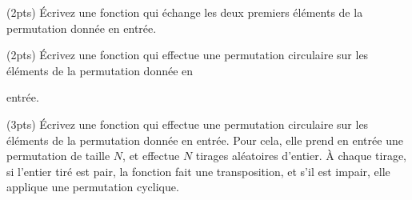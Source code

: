 \question (2pts) {\'E}crivez une fonction  qui {\'e}change les
deux premiers {\'e}l{\'e}ments de la permutation donn{\'e}e en entr{\'e}e.

\question (2pts) {\'E}crivez une fonction  qui effectue une
permutation circulaire sur les {\'e}l{\'e}ments de la permutation donn{\'e}e en

entr{\'e}e.

\question (3pts) {\'E}crivez une fonction  qui effectue
une permutation circulaire sur les {\'e}l{\'e}ments de la permutation donn{\'e}e
en entr{\'e}e. Pour cela, elle prend en entr{\'e}e une permutation de taille
$N$, et effectue $N$ tirages al{\'e}atoires d'entier. {\`A} chaque tirage, si
l'entier tir{\'e} est pair, la fonction fait une transposition, et s'il
est impair, elle applique une permutation cyclique.

